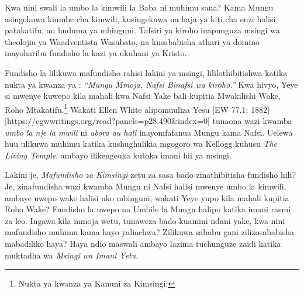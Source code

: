 Kwa nini swali la umbo la kimwili la Baba ni muhimu sana? Kama Mungu asingekuwa kiumbe cha kimwili, kusingekuwa na haja ya kiti cha enzi halisi, patakatifu, au huduma ya mbinguni. Tafsiri ya kiroho inapunguza msingi wa theolojia ya Waadventista Wasabato, na kusababisha athari ya domino inayoharibu fundisho la kazi ya ukuhani ya Kristo.


Fundisho la  lilikuwa mafundisho rahisi lakini ya msingi, lililothibitishwa katika nukta ya kwanza ya : \textit{“Mungu Mmoja, Nafsi Binafsi wa kiroho.”} Kwa hivyo, Yeye si mwenye kuwepo kila mahali kwa Nafsi Yake bali kupitia Mwakilishi Wake, Roho Mtakatifu.\footnote{Nukta ya kwanza ya Kanuni za Kimsingi: } Wakati Ellen White alipomuuliza Yesu [EW 77.1; 1882][https://egwwritings.org/read?panels=p28.490&index=0] tunaona wazi kwamba \textit{umbo la nje la mwili} ni \textit{ubora au hali} inayomfafanua Mungu kama Nafsi. Uelewa huu ulikuwa muhimu katika kushughulikia mgogoro wa Kellogg kuhusu \textit{The Living Temple}, ambayo ilikengeuka kutoka imani hii ya msingi.


Lakini je, \textit{Mafundisho za Kimsingi} zetu za sasa bado zinathibitisha fundisho hili? Je, zinafundisha wazi kwamba Mungu ni Nafsi halisi mwenye umbo la kimwili, ambaye uwepo wake halisi uko mbinguni, wakati Yeye yupo kila mahali kupitia Roho Wake? Fundisho la uwepo na Umbile la Mungu halipo katika imani rasmi za leo. Ingawa kila mmoja wetu, tunaweza bado kuamini ndani yake, kwa nini mafundisho muhimu kama hayo yaliachwa? Zilikuwa sababu gani zilizosababisha mabadiliko haya? Haya ndio maswali ambayo lazima tuchunguze zaidi katika muktadha wa \textit{Msingi wa Imani Yetu}.






